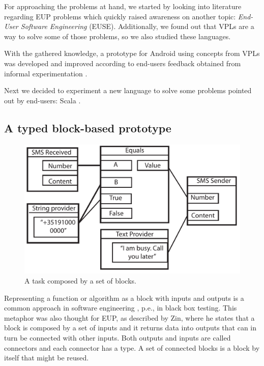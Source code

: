 \documentclass[9pt,a4paper]{extarticle}
\begin{document}
\begin{multicols}{2}
For approaching the problems at hand, we started by looking into literature regarding EUP problems \cite{Barriers2004} which quickly raised awareness on another topic: \emph{End-User Software Engineering} (EUSE).
Additionally, we found out that VPLs are a way to solve some of those problems, so we also studied these languages.

With the gathered knowledge, a prototype for Android using concepts from VPLs was developed and improved according to end-users feedback obtained from informal experimentation . 

Next we decided to experiment a new language to solve some problems pointed out by end-users: Scala \cite{ProgrammingScala}. 

\subsection{A typed block-based prototype}


\begin{figure}[H]
\centerline{\includegraphics[scale=.43]{block_example.pdf}}
\label{fig:block}
\caption{A task composed by a set of blocks.} 
\end{figure}

Representing a function or algorithm as a block with inputs and outputs is a common approach in software engineering , p.e., in black box testing. This metaphor was also thought for EUP, as described by Zin\cite{Zin2011}, where he states that a block is composed by a set of inputs and it returns data into outputs that can in turn be connected with other inputs.
Both outputs and inputs are called connectors and each connector has a type. A set of connected blocks is a block by itself that might be reused. 


\end{multicols}
\end{document}
